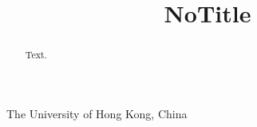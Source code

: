 \documentclass[preprint]{sigplanconf}
\begin{document}
\toappear{}

\setlength{\pdfpageheight}{\paperheight}
\setlength{\pdfpagewidth}{\paperwidth}




\title{NoTitle}

           {The University of Hong Kong, China}

\maketitle

\begin{abstract}
  Text.
\end{abstract}

\begin{comment}
\category{CR-number}{subcategory}{third-level}

\terms
term1, term2

\keywords
keyword1, keyword2
\end{comment}
                



\end{document}
